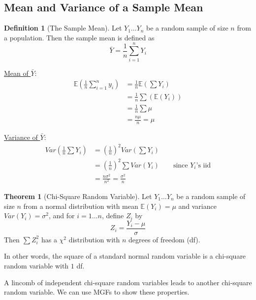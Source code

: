 \documentclass[11pt]{article}
\theoremstyle{definition}
\newtheorem{theorem}{Theorem}[section]
\newtheorem{definition}{Definition}[section]
\numberwithin{equation}{section}
\begin{document}
\subsection{Mean and Variance of a Sample Mean}
\begin{definition}[The Sample Mean]
  Let $Y_1\dots Y_n$ be a random sample of size $n$ from a population. Then the sample mean is defined as 
  \begin{equation}
    \bar{Y}=\frac{1}{n}\sum^n_{i=1} Y_i
  \end{equation}

\underline{Mean of $\bar{Y}$}:
  \begin{align}
    \mathbb{E}\left( \frac{1}{n}\sum^n_{i=1}y_i \right) &= \frac{1}{n}\mathbb{E}\left(\sum Y_i\right)\\
    &= \frac{1}{n}\sum\left( \mathbb{E}(Y_i) \right)\\ 
    &= \frac{1}{n}\sum \mu\\
    &= \frac{n\mu}{n}=\mu
  \end{align}

\underline{Variance of $\bar{Y}$}:
\begin{align}
  Var\left(\frac{1}{n}\sum Y_i\right) &= \left(\frac{1}{n}\right)^2 Var\left( \sum Y_i \right)\\
  &= \left(\frac{1}{n}\right)^2\sum Var( Y_i )\qquad\text{since }Y_i\text{'s iid}\\
  &= \frac{n\sigma^2}{n^2} = \frac{\sigma^2}{n}
\end{align}
\end{definition}

\begin{theorem}[Chi-Square Random Variable]
Let $Y_1\dots Y_n$ be a random sample of size $n$ from a normal distribution with mean $\mathbb{E}(Y_i) = \mu$ and variance $Var(Y_i)=\sigma^2$, and for $i=1\dots n$, define $Z_i$ by 
\begin{equation}
  Z_i=\frac{Y_i - \mu}{\sigma}
\end{equation}
Then $\sum Z_i^2$ has a $\chi^2$ distribution with $n$ degrees of freedom (df).
\end{theorem}
\begin{writenotes}
  In other words, the square of a standard normal random variable is a chi-square random variable with $1$ df.

  A lincomb of independent chi-square random variables leads to another chi-square random variable. We can use MGFs to show these properties.
\end{writenotes}
\end{document}
